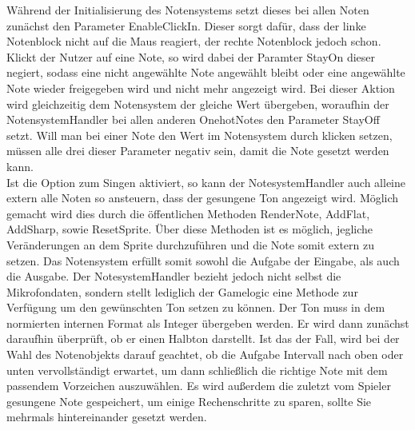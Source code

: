 Während der Initialisierung des Notensystems setzt dieses bei allen Noten zunächst den Parameter EnableClickIn. Dieser sorgt dafür, dass der linke Notenblock nicht auf die Maus reagiert, der rechte Notenblock jedoch schon. Klickt der Nutzer auf eine Note, so wird dabei der Paramter StayOn dieser negiert, sodass eine nicht angewählte Note angewählt bleibt oder eine angewählte Note wieder freigegeben wird und nicht mehr angezeigt wird. Bei dieser Aktion wird gleichzeitig dem Notensystem der gleiche Wert übergeben, woraufhin der NotensystemHandler bei allen anderen OnehotNotes den Parameter StayOff setzt. Will man bei einer Note den Wert im Notensystem durch klicken setzen, müssen alle drei dieser Parameter negativ sein, damit die Note gesetzt werden kann. \\
Ist die Option zum Singen aktiviert, so kann der NotesystemHandler auch alleine extern alle Noten so ansteuern, dass der gesungene Ton angezeigt wird. Möglich gemacht wird dies durch die öffentlichen Methoden RenderNote, AddFlat, AddSharp, sowie ResetSprite. Über diese Methoden ist es möglich, jegliche Veränderungen an dem Sprite durchzuführen und die Note somit extern zu setzen. Das Notensystem erfüllt somit sowohl die Aufgabe der Eingabe, als auch die Ausgabe. Der NotesystemHandler bezieht jedoch nicht selbst die Mikrofondaten, sondern stellt lediglich der Gamelogic eine Methode zur Verfügung um den gewünschten Ton setzen zu können. Der Ton muss in dem normierten internen Format als Integer übergeben werden. Er wird dann zunächst daraufhin überprüft, ob er einen Halbton darstellt. Ist das der Fall, wird bei der Wahl des Notenobjekts darauf geachtet, ob die Aufgabe Intervall nach oben oder unten vervollständigt erwartet, um dann schließlich die richtige Note mit dem passendem Vorzeichen auszuwählen. Es wird außerdem die zuletzt vom Spieler gesungene Note gespeichert, um einige Rechenschritte zu sparen, sollte Sie mehrmals hintereinander gesetzt werden. 


